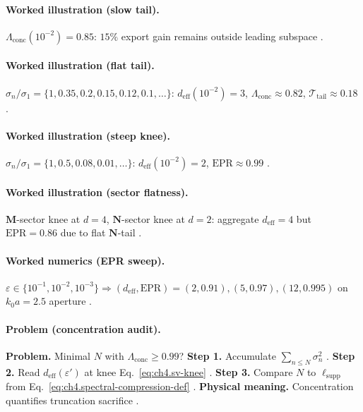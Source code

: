 \paragraph{Worked illustration (slow tail).}
\(\Lambda_{\mathrm{conc}}(10^{-2})=0.85\): \(15\%\) export gain remains outside leading subspace \cite{harrington2001,hansen1988,devaney2004}.

\paragraph{Worked illustration (flat tail).}
\(\sigma_{n}/\sigma_{1}=\{1,0.35,0.2,0.15,0.12,0.1,\ldots\}\): \(d_{\mathrm{eff}}(10^{-2})=3\), \(\Lambda_{\mathrm{conc}}\approx0.82\),
\(\mathcal{T}_{\mathrm{tail}}\approx0.18\) \cite{hansen1988,harrington2001}.

\paragraph{Worked illustration (steep knee).}
\(\sigma_{n}/\sigma_{1}=\{1,0.5,0.08,0.01,\ldots\}\): \(d_{\mathrm{eff}}(10^{-2})=2\), \(\mathrm{EPR}\approx0.99\) \cite{harrington2001,devaney2004,stratton1941}.

\paragraph{Worked illustration (sector flatness).}
\(\mathbf{M}\)-sector knee at \(d=4\), \(\mathbf{N}\)-sector knee at \(d=2\): aggregate \(d_{\mathrm{eff}}=4\) but \(\mathrm{EPR}=0.86\) due to flat
\(\mathbf{N}\)-tail \cite{harrington2001,hansen1988}.

\paragraph{Worked numerics (EPR sweep).}
\(\varepsilon\in\{10^{-1},10^{-2},10^{-3}\}\Rightarrow(d_{\mathrm{eff}},\mathrm{EPR})=(2,0.91),(5,0.97),(12,0.995)\) on \(k_{0}a=2.5\) aperture
\cite{hansen1988,harrington2001,devaney2004}.

\paragraph{Problem (concentration audit).}
\textbf{Problem.} Minimal \(N\) with \(\Lambda_{\mathrm{conc}}\ge0.99\)?
\textbf{Step 1.} Accumulate \(\sum_{n\le N}\sigma_{n}^{2}\) \cite{harrington2001}.
\textbf{Step 2.} Read \(d_{\mathrm{eff}}(\varepsilon')\) at knee Eq.~\eqref{eq:ch4.sv-knee} \cite{hansen1988,devaney2004}.
\textbf{Step 3.} Compare \(N\) to \(\ell_{\mathrm{supp}}\) from Eq.~\eqref{eq:ch4.spectral-compression-def} \cite{stratton1941}.
\textbf{Physical meaning.} Concentration quantifies truncation sacrifice \cite{hansen1988}.


